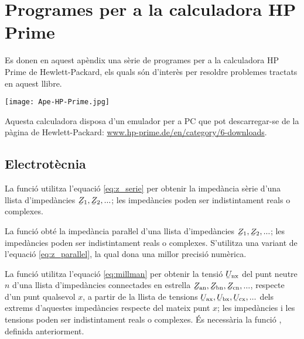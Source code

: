 \chapter{Programes per a la calculadora \textsf{HP Prime}}\label{sec:progs-HP}

\lstset{
	language=HPPRIME,
	basicstyle=\small\sf,
	numbers=left,
	frame=lines
}

Es donen en aquest apèndix una sèrie de programes per a la calculadora \textsf{HP Prime} de Hewlett-Packard, els quals són d'interès per resoldre problemes tractats en aquest llibre.

\begin{center}
\texttt{[image: Ape-HP-Prime.jpg]}
\end{center}

Aquesta calculadora disposa d'un emulador per a PC que pot descarregar-se de la pàgina de Hewlett-Packard: \href{http://www.hp-prime.de/en/category/6-downloads}{www.hp-prime.de/en/category/6-downloads}.

\section{Electrotècnia}\label{sec:HP_ELC}

La funció  utilitza l'equació \eqref{eq:z_serie} per obtenir la impedància sèrie d'una llista d'impedàncies $\cmplx{Z}_1, \cmplx{Z}_2, ...$; les impedàncies poden ser indistintament reals o complexes.




La funció  obté la impedància paraŀlel  d'una llista d'impedàncies $\cmplx{Z}_1, \cmplx{Z}_2, ...$; les impedàncies poden ser indistintament reals o complexes. S'utilitza una variant de l'equació \eqref{eq:z_parallel}, la qual dona una millor precisió numèrica.




La funció  utilitza l'equació \eqref{eq:millman} per obtenir la tensió $\cmplx{U}\ped{nx}$ del punt neutre $n$ d'una llista d'impedàncies connectades en estrella $\cmplx{Z}\ped{an}, \cmplx{Z}\ped{bn}, \cmplx{Z}\ped{cn}, ...$, respecte d'un punt qualsevol $x$, a partir de la llista de tensions $\cmplx{U}\ped{ax}, \cmplx{U}\ped{bx}, \cmplx{U}\ped{cx}, ...$ dels extrems d'aquestes impedàncies respecte del mateix punt $x$; les impedàncies i les tensions poden ser indistintament reals o complexes. És necessària la funció , definida anteriorment.

